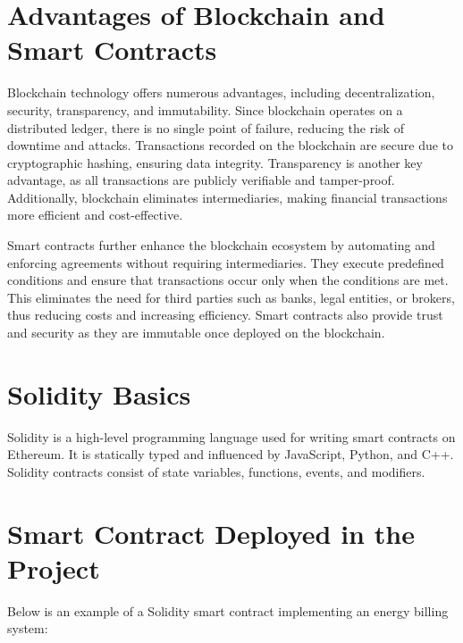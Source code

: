 \documentclass[a4paper,12pt]{report}
\begin{document}
 \section{Advantages of Blockchain and Smart Contracts}
 Blockchain technology offers numerous advantages, including decentralization, security, transparency, and immutability. Since blockchain operates on a distributed ledger, there is no single point of failure, reducing the risk of downtime and attacks. Transactions recorded on the blockchain are secure due to cryptographic hashing, ensuring data integrity. Transparency is another key advantage, as all transactions are publicly verifiable and tamper-proof. Additionally, blockchain eliminates intermediaries, making financial transactions more efficient and cost-effective.
 
 Smart contracts further enhance the blockchain ecosystem by automating and enforcing agreements without requiring intermediaries. They execute predefined conditions and ensure that transactions occur only when the conditions are met. This eliminates the need for third parties such as banks, legal entities, or brokers, thus reducing costs and increasing efficiency. Smart contracts also provide trust and security as they are immutable once deployed on the blockchain.
 
 \section{Solidity Basics}
 Solidity is a high-level programming language used for writing smart contracts on Ethereum. It is statically typed and influenced by JavaScript, Python, and C++. Solidity contracts consist of state variables, functions, events, and modifiers. 
 
 \section{Smart Contract Deployed in the Project}
 Below is an example of a Solidity smart contract implementing an energy billing system:
 
\end{document}
